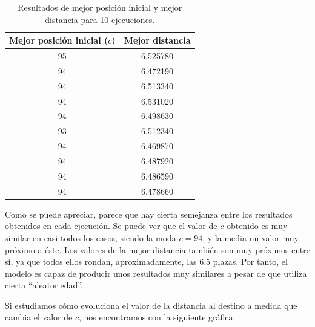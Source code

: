 \documentclass[11pt,a4paper]{report}
\begin{document}
\begin{table}[H]
\centering
\begin{tabular}{c|c}
\textbf{Mejor posición inicial ($c$)} & \textbf{Mejor distancia} \\ \hline
95                              & 6.525780                 \\
94                              & 6.472190                 \\
94                              & 6.513340                 \\
94                              & 6.531020                 \\
94                              & 6.498630                 \\
93                              & 6.512340                 \\
94                              & 6.469870                 \\
94                              & 6.487920                 \\
94                              & 6.486590                 \\
94                              & 6.478660                
\end{tabular}
\caption{Resultados de mejor posición inicial y mejor distancia para 10 ejecuciones.}
\label{aparc-tabla}
\end{table}

Como se puede apreciar, parece que hay cierta semejanza entre los resultados obtenidos en cada
ejecución. Se puede ver que el valor de $c$ obtenido es muy similar en casi todos los casos, siendo
la moda $c = 94$, y la media un valor muy próximo a éste. Los valores de la mejor distancia también
son muy próximos entre sí, ya que todos ellos rondan, aproximadamente, las 6.5 plazas. Por tanto, el
modelo es capaz de producir unos resultados muy similares a pesar de que utiliza cierta ``aleatoriedad''.

Si estudiamos cómo evoluciona el valor de la distancia al destino a medida que cambia el valor de $c$, nos
encontramos con la siguiente gráfica:
\end{document}

